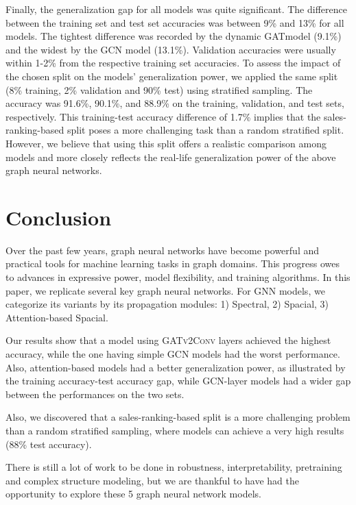 \documentclass[sigconf, nonacm]{acmart}
\begin{document}
Finally, the generalization gap for all models was quite significant. The difference between the training set and test set accuracies was between 9\% and 13\% for all models. The tightest difference was recorded by the dynamic \textsc{GAT}model \cite{Brodyetal} (9.1\%) and the widest by the \textsc{GCN} model \cite{Kipf&Welling2017} (13.1\%). Validation accuracies were usually within 1-2\% from the respective training set accuracies. To assess the impact of the chosen split on the models' generalization power, we applied the same split (8\% training, 2\% validation and 90\% test) using stratified sampling. The accuracy was 91.6\%, 90.1\%, and 88.9\% on the training, validation, and test sets, respectively. This training-test accuracy difference of 1.7\% implies that the sales-ranking-based split poses a more challenging task than a random stratified split. However, we believe that using this split offers a realistic comparison among models and more closely reflects the real-life generalization power of the above graph neural networks.

\section*{Conclusion}
Over the past few years, graph neural networks have become powerful and practical tools for machine learning tasks in graph domains. This progress owes to advances in expressive power, model flexibility, and training algorithms. In this paper, we replicate several key graph neural networks. For GNN models, we categorize its variants by its propagation modules: 1) Spectral, 2) Spacial, 3) Attention-based Spacial.

Our results show that a model using \textsc{GATv2Conv} layers \cite{Brodyetal} achieved the highest accuracy, while the one having simple \textsc{GCN} models \cite{Kipf&Welling2017} had the worst performance. Also, attention-based models had a better generalization power, as illustrated by the training accuracy-test accuracy gap, while \textsc{GCN}-layer models had a wider gap between the performances on the two sets.

Also, we discovered that a sales-ranking-based split is a more challenging problem than a random stratified sampling, where models can achieve a very high results (88\% test accuracy).

There is still a lot of work to be done in robustness, interpretability, pretraining and complex structure modeling, but we are thankful to have had the opportunity to explore these 5 graph neural network models. 

\medskip


\printbibliography
\end{document}
